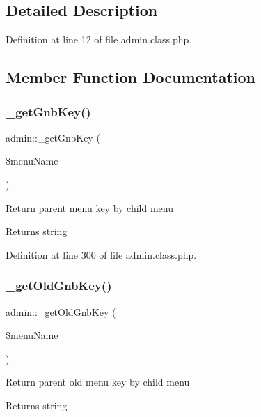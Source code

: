 \subsection{Detailed Description}


Definition at line 12 of file admin.\+class.\+php.



\subsection{Member Function Documentation}
\mbox{\label{classadmin_a7297fe26173604ac1cd8f736474873a4}} 
\subsubsection{\texorpdfstring{\+\_\+get\+Gnb\+Key()}{\_getGnbKey()}}
{\footnotesize\ttfamily admin\+::\+\_\+get\+Gnb\+Key (\begin{DoxyParamCaption}\item[{}]{\$menu\+Name }\end{DoxyParamCaption})}

Return parent menu key by child menu \begin{DoxyReturn}{Returns}
string 
\end{DoxyReturn}


Definition at line 300 of file admin.\+class.\+php.

\mbox{\label{classadmin_ad7c619fa724464fdebf9523c2654ff3b}} 
\subsubsection{\texorpdfstring{\+\_\+get\+Old\+Gnb\+Key()}{\_getOldGnbKey()}}
{\footnotesize\ttfamily admin\+::\+\_\+get\+Old\+Gnb\+Key (\begin{DoxyParamCaption}\item[{}]{\$menu\+Name }\end{DoxyParamCaption})}

Return parent old menu key by child menu \begin{DoxyReturn}{Returns}
string 
\end{DoxyReturn}


